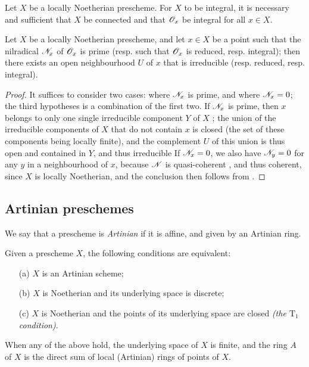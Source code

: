 \begin{corollary}[6.1.12]
\label{I.6.1.12}
Let $X$ be a locally Noetherian prescheme.
For $X$ to be integral, it is necessary and sufficient that $X$ be connected and that $\mathscr{O}_x$ be integral for all $x\in X$.
\end{corollary}

\begin{proposition}[6.1.13]
\label{I.6.1.13}
Let $X$ be a locally Noetherian prescheme, and let $x\in X$ be a point such that the nilradical $\mathscr{N}_x$ of $\mathscr{O}_x$ is prime (resp. such that $\mathscr{O}_x$ is reduced, resp. integral);
then there exists an open neighbourhood $U$ of $x$ that is irreducible (resp. reduced, resp. integral).
\end{proposition}

\begin{proof}
\label{proof-1.6.1.13}
It suffices to consider two cases: where $\mathscr{N}_x$ is prime, and where $\mathscr{N}_x=0$; the third hypotheses is a combination of the first two.
If $\mathscr{N}_x$ is prime, then $x$ belongs to only one single irreducible component $Y$ of $X$ ;
the union of the irreducible components of $X$ that do not contain $x$ is closed (the set of these components being locally finite), and the complement $U$ of this union is thus open and contained in $Y$, and thus irreducible 
If $\mathscr{N}_x=0$, we also have $\mathscr{N}_y=0$ for any $y$ in a neighbourhood of $x$, because $\mathscr{N}$ is quasi-coherent , and thus coherent, since $X$ is locally Noetherian, and the conclusion then follows from .
\end{proof}

\subsection{Artinian preschemes}
\label{subsection:I.6.2}

\begin{definition}[6.2.1]
\label{I.6.2.1}
We say that a prescheme is \emph{Artinian} if it is affine, and given by an Artinian ring.
\end{definition}

\begin{proposition}[6.2.2]
\label{I.6.2.2}
Given
a prescheme $X$, the following conditions are equivalent:
\begin{enumerate}
  \item[{\rm(a)}] $X$ is an Artinian scheme;
  \item[{\rm(b)}] $X$ is Noetherian and its underlying space is discrete;
  \item[{\rm(c)}] $X$ is Noetherian and the points of its underlying space are closed \emph{(the $\mathrm{T}_1$ condition)}.
\end{enumerate}
When any of the above hold, the underlying space of $X$ is finite, and the ring $A$ of $X$ is the direct sum of local (Artinian) rings of points of $X$.
\end{proposition}

